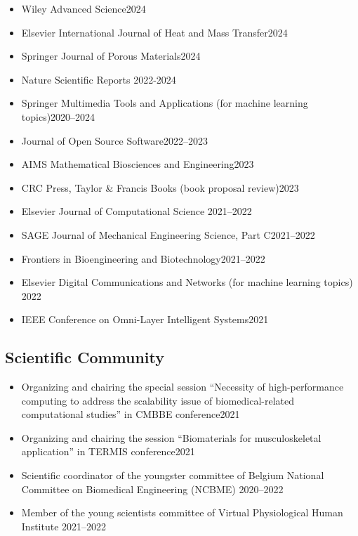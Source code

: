 \documentclass{cv}
\begin{document}
\begin{itemize}[itemsep=-0.2ex]
\item
Wiley Advanced Science\hfill 2024
\item
Elsevier International Journal of Heat and Mass Transfer\hfill 2024
\item
Springer Journal of Porous Materials\hfill 2024
\item
Nature Scientific Reports \hfill 2022-2024
\item
Springer Multimedia Tools and Applications (for machine learning topics)\hfill 2020--2024
\item
Journal of Open Source Software\hfill 2022--2023
\item
AIMS Mathematical Biosciences and Engineering\hfill 2023
\item
CRC Press, Taylor \& Francis Books (book proposal review)\hfill 2023
\item
Elsevier Journal of Computational Science \hfill 2021--2022
\item
SAGE Journal of Mechanical Engineering Science, Part C\hfill 2021--2022
\item
Frontiers in Bioengineering and Biotechnology\hfill 2021--2022
\item
Elsevier Digital Communications and Networks (for machine learning topics) \hfill 2022
\item
IEEE Conference on Omni-Layer Intelligent Systems\hfill 2021
\end{itemize}

\subsection{Scientific Community}

\begin{itemize}[itemsep=-0.2ex]
\item
Organizing and chairing the special session  ``Necessity of high-performance computing to address the scalability issue of biomedical-related computational studies'' in CMBBE conference\hfill 2021
\item
Organizing and chairing the session  ``Biomaterials for musculoskeletal application'' in TERMIS conference\hfill 2021
\item
Scientific coordinator of the youngster committee of Belgium National Committee on Biomedical Engineering (NCBME) \hfill 2020--2022
\item
Member of the young scientists committee of Virtual Physiological Human Institute \hfill 2021--2022
\end{itemize}
\end{document}
